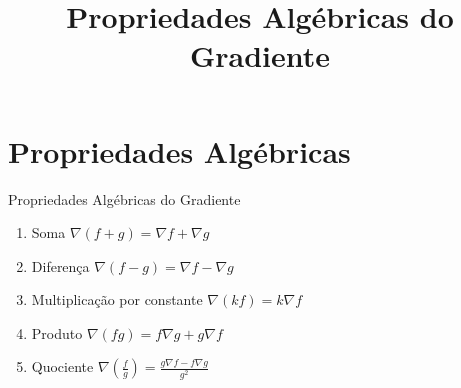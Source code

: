 \documentclass[fleqn,utf8,aspectratio=169,12pt]{beamer}
\title{Propriedades Algébricas do Gradiente}
\begin{document}
\addtitle

\section{Propriedades Algébricas}

\begin{frame}{Propriedades Algébricas do Gradiente}
  \begin{enumerate}[<+->]
    \setlength\itemsep{1.3em}
    \item Soma                        \tabto{55mm} \(\nabla(f+g) = \nabla f + \nabla g\)
    \item Diferença                   \tabto{55mm} \(\nabla(f-g) = \nabla f - \nabla g\)
    \item Multiplicação por constante \tabto{55mm} \(\nabla(kf) = k\nabla f\)
    \item Produto                     \tabto{55mm} \(\nabla(fg) = f\nabla g + g\nabla f\)
    \item Quociente                   \tabto{55mm}
      \(\nabla\left(\frac{f}{g}\right) = \frac{g\nabla f - f\nabla g}{g^2}\)
  \end{enumerate}
\end{frame}



\end{document}
